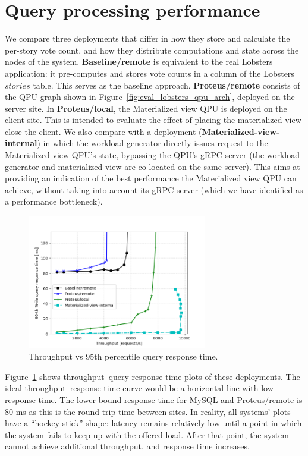 \section{Query processing performance}
\label{sec:eval_query_processing_perf}
We compare three deployments that differ in how they store and calculate the per-story vote count,
and how they distribute computations and state across the nodes of the system.
\textbf{Baseline/remote} is equivalent to the real Lobsters application:
it pre-computes and stores vote counts in a column of the Lobsters $stories$ table.
This serves as the baseline approach.
\textbf{Proteus/remote} consists of the QPU graph shown in Figure~\ref{fig:eval_lobsters_qpu_arch},
deployed on the server site.
In \textbf{Proteus/local}, the Materialized view QPU is deployed on the client site.
This is intended to evaluate the effect of placing the materialized view close the client.
We also compare with a deployment (\textbf{Materialized-view-internal}) in which the workload generator
directly issues request to the Materialized view QPU's state, bypassing the QPU's gRPC server
(the workload generator and materialized view are co-located on the same server).
This aims at providing an indication of the best performance the Materialized view QPU can achieve,
without taking into account its gRPC server (which we have identified as a performance bottleneck).

\begin{figure}[H]
\centering
  \includegraphics[width=0.7\textwidth]{./figures/evaluation/responseTime.png}
  \caption{Throughput vs 95th percentile query response time.}
  \label{fig:responseTime}
\end{figure}

Figure~\ref{fig:responseTime} shows throughput--query response time plots of these deployments.
The ideal throughput--response time curve would be a horizontal line with low response time.
The lower bound response time for MySQL and Proteus/remote is 80 ms as this is the round-trip time between sites.
In reality, all systems' plots have a ``hockey stick'' shape:
latency remains relatively low until a point in which the system fails to keep up with the offered load.
After that point, the system cannot achieve additional throughput, and response time increases.

